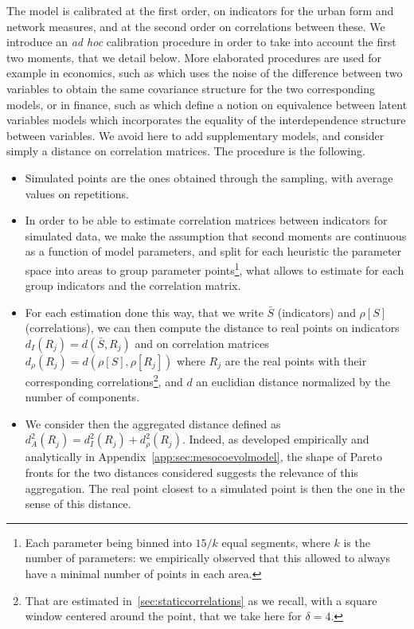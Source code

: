 The model is calibrated at the first order, on indicators for the urban form and network measures, and at the second order on correlations between these. We introduce an \emph{ad hoc} calibration procedure in order to take into account the first two moments, that we detail below. More elaborated procedures are used for example in economics, such as \cite{watson1993measures} which uses the noise of the difference between two variables to obtain the same covariance structure for the two corresponding models, or in finance, such as \cite{frey2001copulas} which define a notion on equivalence between latent variables models which incorporates the equality of the interdependence structure between variables. We avoid here to add supplementary models, and consider simply a distance on correlation matrices. The procedure is the following.
\begin{itemize}
	\item Simulated points are the ones obtained through the sampling, with average values on repetitions.
	\item In order to be able to estimate correlation matrices between indicators for simulated data, we make the assumption that second moments are continuous as a function of model parameters, and split for each heuristic the parameter space into areas to group parameter points\footnote{Each parameter being binned into $15 / k$ equal segments, where $k$ is the number of parameters: we empirically observed that this allowed to always have a minimal number of points in each area.}, what allows to estimate for each group indicators and the correlation matrix.
	\item For each estimation done this way, that we write $\bar{S}$ (indicators) and $\rho [S]$ (correlations), we can then compute the distance to real points on indicators $d_I (R_j) = d(\bar{S},R_j)$ and on correlation matrices $d_{\rho} (R_j) = d(\rho [S],\rho[R_j])$ where $R_j$ are the real points with their corresponding correlations\footnote{That are estimated in~\ref{sec:staticcorrelations} as we recall, with a square window centered around the point, that we take here for $\delta = 4$.}, and $d$ an euclidian distance normalized by the number of components.
	\item We consider then the aggregated distance defined as $d_A^2 (R_j) = d_I^2 (R_j) + d_{\rho}^2 (R_j)$. Indeed, as developed empirically and analytically in Appendix~\ref{app:sec:mesocoevolmodel}, the shape of Pareto fronts for the two distances considered suggests the relevance of this aggregation. The real point closest to a simulated point is then the one in the sense of this distance.
\end{itemize}


